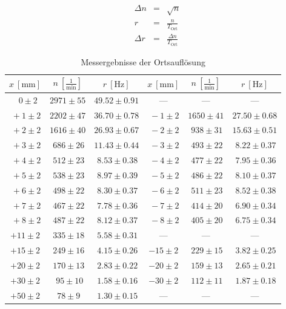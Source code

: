 \documentclass[12pt,a4paper]{scrartcl}
\numberwithin{equation}{section} %
\begin{document}
\begin{eqnarray}
	\Delta n &=& \sqrt{n} \label{eq:Delta n} \\
	r &=& \frac{n}{T_\mathrm{Ort}} \label{eq:Zählrate} \\
	\Delta r &=& \frac{\Delta n}{T_\mathrm{Ort}} \label{eq:ZählrateFehler}
\end{eqnarray}


\begin{table}[h]
	\centering
	\begin{tabular}{c|c|c||c|c|c}
		$x\ [\mathrm{mm}]$ & $n\ [\frac{1}{\mathrm{min}}]$ & $r\ [\mathrm{Hz}]$ &
		$x\ [\mathrm{mm}]$ & $n\ [\frac{1}{\mathrm{min}}]$ & $r\ [\mathrm{Hz}]$ \\
		\hline
		$\ \ \ 0 \pm 2$ & $2971 \pm 55$ & $49.52 \pm 0.91$ &---&---&--- \\
		$\ +1 \pm 2$ & $2202 \pm 47$ & $36.70 \pm 0.78$ &
		$\ -1 \pm 2$ & $1650 \pm 41$ & $27.50 \pm 0.68$ \\
		$\ +2 \pm 2$ & $1616 \pm 40$ & $26.93 \pm 0.67$ &
		$\ -2 \pm 2$ & $\ 938 \pm 31$ & $15.63 \pm 0.51$ \\
		$\ +3 \pm 2$ & $\ 686 \pm 26$ & $11.43 \pm 0.44$ &
		$\ -3 \pm 2$ & $\ 493 \pm 22$ & $\ 8.22 \pm 0.37$ \\
		$\ +4 \pm 2$ & $\ 512 \pm 23$ & $\ 8.53 \pm 0.38$ &
		$\ -4 \pm 2$ & $\ 477 \pm 22$ & $\ 7.95 \pm 0.36$ \\
		$\ +5 \pm 2$ & $\ 538 \pm 23$ & $\ 8.97 \pm 0.39$ &
		$\ -5 \pm 2$ & $\ 486 \pm 22$ & $\ 8.10 \pm 0.37$ \\
		$\ +6 \pm 2$ & $\ 498 \pm 22$ & $\ 8.30 \pm 0.37$ &
		$\ -6 \pm 2$ & $\ 511 \pm 23$ & $\ 8.52 \pm 0.38$ \\
		$\ +7 \pm 2$ & $\ 467 \pm 22$ & $\ 7.78 \pm 0.36$ &
		$\ -7 \pm 2$ & $\ 414 \pm 20$ & $\ 6.90 \pm 0.34$ \\
		$\ +8 \pm 2$ & $\ 487 \pm 22$ & $\ 8.12 \pm 0.37$ &
		$\ -8 \pm 2$ & $\ 405 \pm 20$ & $\ 6.75 \pm 0.34$ \\
		$+11 \pm 2$ & $\ 335 \pm 18$ & $\ 5.58 \pm 0.31$ &---&---&---\\
		$+15 \pm 2$ & $\ 249 \pm 16$ & $\ 4.15 \pm 0.26$ &
		$-15 \pm 2$ & $\ 229 \pm 15$ & $\ 3.82 \pm 0.25$ \\
		$+20 \pm 2$ & $\ 170 \pm 13$ & $\ 2.83 \pm 0.22$ &
		$-20 \pm 2$ & $\ 159 \pm 13$ & $\ 2.65 \pm 0.21$ \\
		$+30 \pm 2$ & $\ \ 95 \pm 10$ & $\ 1.58 \pm 0.16$ &
		$-30 \pm 2$ & $\ 112 \pm 11$ & $\ 1.87 \pm 0.18$ \\
		$+50 \pm 2$ & $\ 78 \pm 9$ & $\ 1.30 \pm 0.15$ &---&---&---
	\end{tabular}
	\caption{Messergebnisse der Ortsauflösung}
	\label{tab:Ortsauflösung}
\end{table}
\end{document}
